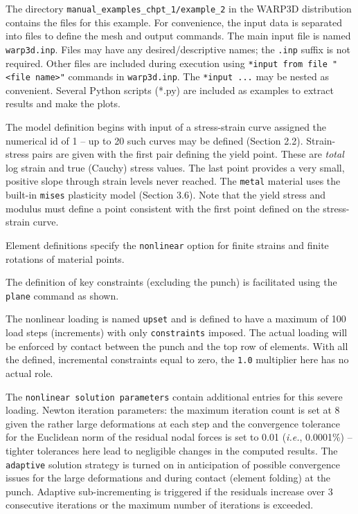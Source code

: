 \documentclass[11pt]{report}
\numberwithin{equation}{section}
\newcommand{\ttt} {\texttt}  %
\newcommand{\ie}{\emph{i.e.},\xspace}
\newcommand{\ti}{\emph}
\newcommand{\nid}{\noindent}
\begin{document}
{\nid The directory \ttt{manual\_examples\_chpt\_1/example\_2} in the WARP3D
distribution contains the files for this example. 
For convenience, the input data is separated into files to define the mesh
and output commands. The main input file is named \ttt{warp3d.inp}. Files 
may have any desired/descriptive names; the \ttt{.inp} suffix is not required. Other files are 
included during execution using
\ttt{*input from file "<file name>"} commands in \ttt{warp3d.inp}. The \ttt{*input ...} may be nested
as convenient. Several Python scripts (*.py) are included as 
examples to extract results and make the plots.

The model definition begins with input of a stress-strain curve assigned the numerical id of 1 -- up to 
20 such curves may be defined (Section 2.2).  Strain-stress pairs are given with the first pair defining
the yield point. These are \ti{total} log strain and true (Cauchy) stress values. The last point provides 
a very small, positive slope through strain levels never reached. The \ttt{metal} material uses the
built-in \ttt{mises} plasticity model (Section 3.6). Note that the yield stress and modulus must
define a point consistent with the first point defined on the stress-strain curve.

Element definitions specify the \ttt{nonlinear} option for 
finite strains and finite rotations of material points.

The definition of key constraints (excluding the punch) is facilitated using the
\ttt{plane} command as shown.

The nonlinear loading is named \ttt{upset} and is defined to have a maximum of 100 load steps (increments)
with only \ttt{constraints} imposed. The actual loading will be enforced by
contact between the punch and the top row of elements. With all the defined, incremental constraints equal to
zero, the \ttt{1.0} multiplier here has no actual role. 

The \ttt{nonlinear solution parameters} contain additional entries for this severe loading.
Newton iteration parameters: the maximum iteration count is set at 8 given the rather large deformations
at each step and the convergence tolerance for the Euclidean norm of the  residual nodal forces is set to 0.01
(\ie 0.0001\%) -- tighter tolerances here lead to negligible changes in the computed results. The \ttt{adaptive}
solution strategy is turned on in anticipation of possible convergence issues for the large deformations and during
contact (element folding) at the punch.  Adaptive sub-incrementing is triggered if the residuals increase over 3
consecutive iterations or the maximum number of iterations is exceeded.

}
\end{document}
